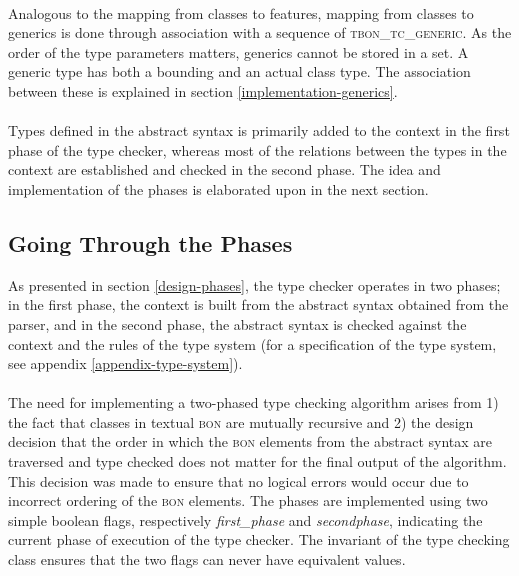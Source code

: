 \paragraph{} Analogous to the mapping from classes to features, mapping from classes to generics is done through association with a sequence of \textsc{tbon\_tc\_generic}. As the order of the type parameters matters, generics cannot be stored in a set. A generic type has both a bounding and an actual class type. The association between these is explained in section \ref{implementation-generics}.

\paragraph{}
Types defined in the abstract syntax is primarily added to the context in the first phase of the type checker, whereas most of the relations between the types in the context are established and checked in the second phase. The idea and implementation of the phases is elaborated upon in the next section.

\subsection{Going Through the Phases}
\label{implementation-phases}
As presented in section \ref{design-phases}, the type checker operates in two phases; in the first phase, the context is built from the abstract syntax obtained from the parser, and in the second phase, the abstract syntax is checked against the context and the rules of the type system (for a specification of the type system, see appendix \ref{appendix-type-system}).
\paragraph{} %
The need for implementing a two-phased type checking algorithm arises from 1) the fact that classes in textual \textsc{bon} are mutually recursive and 2) the design decision that the order in which the \textsc{bon} elements from the abstract syntax are traversed and type checked does not matter for the final output of the algorithm. This decision was made to ensure that no logical errors would occur due to incorrect ordering of the \textsc{bon} elements.
The phases are implemented using two simple boolean flags, respectively \textit{first\_phase} and \textit{second\textunderscore phase}, indicating the current phase of execution of the type checker. The invariant of the type checking class ensures that the two flags can never have equivalent values.

